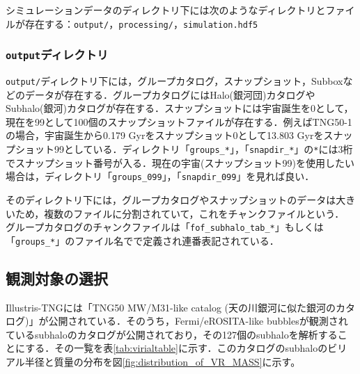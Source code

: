 シミュレーションデータのディレクトリ下には次のようなディレクトリとファイルが存在する：\texttt{output/}，\texttt{processing/}，\texttt{simulation.hdf5}

\subsubsection{\texttt{output}ディレクトリ}

\texttt{output/}ディレクトリ下には，グループカタログ，スナップショット，Subboxなどのデータが存在する．グループカタログにはHalo(銀河団)カタログやSubhalo(銀河)カタログが存在する．スナップショットには宇宙誕生を0として，現在を99として100個のスナップショットファイルが存在する．例えばTNG50-1の場合，宇宙誕生から0.179 Gyrをスナップショット0として13.803 Gyrをスナップショット99としている．ディレクトリ「\texttt{groups\_*}」，「\texttt{snapdir\_*}」の\texttt{*}には3桁でスナップショット番号が入る．現在の宇宙(スナップショット99)を使用したい場合は，ディレクトリ「\texttt{groups\_099}」，「\texttt{snapdir\_099}」を見れば良い．

そのディレクトリ下には，グループカタログやスナップショットのデータは大きいため，複数のファイルに分割されていて，これをチャンクファイルという． グループカタログのチャンクファイルは「\texttt{fof\_subhalo\_tab\_*}」もしくは「\texttt{groups\_*}」のファイル名でで定義され連番表記されている．

\subsection{観測対象の選択}

Illustris-TNGには「TNG50 MW/M31-like catalog (天の川銀河に似た銀河のカタログ)」が公開されている\citep{pillepich_milky_2023}．そのうち，Fermi/eROSITA-like bubblesが観測されているsubhaloのカタログが公開されており\citep{pillepich_x-ray_2021}，その127個のsubhaloを解析することにする．その一覧を表\ref{tab:virialtable}に示す．このカタログのsubhaloのビリアル半径と質量の分布を図\ref{fig:distribution_of_VR_MASS}に示す。

